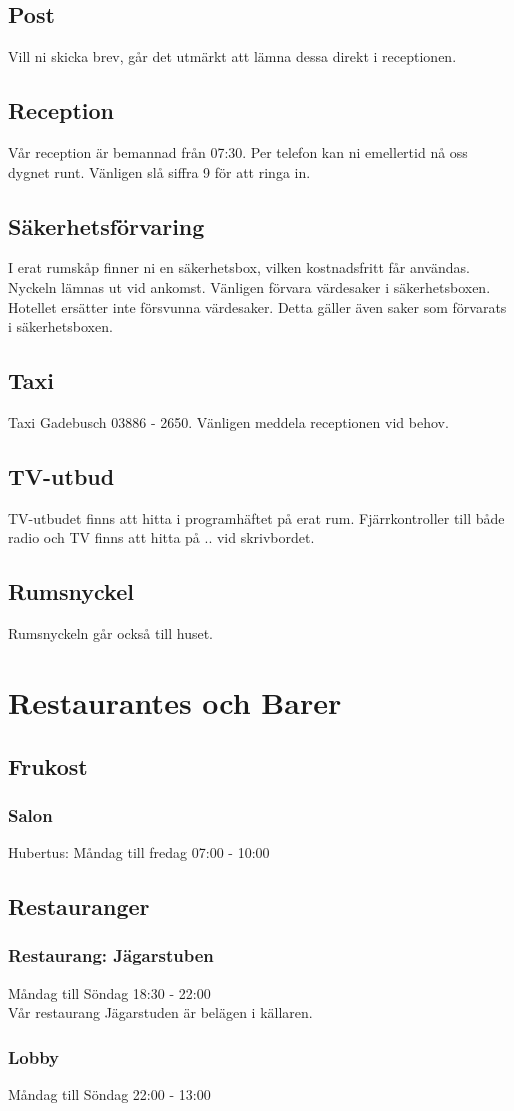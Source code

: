 \documentclass{article}
\begin{document}
\subsection{Post}
Vill ni skicka brev, går det utmärkt att lämna dessa direkt i receptionen.

\subsection{Reception}
Vår reception är bemannad från 07:30. Per telefon kan ni emellertid nå oss dygnet runt. Vänligen slå siffra 9 för
att ringa in.
\subsection{Säkerhetsförvaring}
I erat rumskåp finner ni en säkerhetsbox, vilken kostnadsfritt får användas.
Nyckeln lämnas ut vid ankomst.  Vänligen förvara värdesaker i säkerhetsboxen.
Hotellet ersätter inte försvunna värdesaker. Detta gäller även saker som
förvarats i säkerhetsboxen.

\subsection{Taxi}
Taxi Gadebusch 03886 - 2650. Vänligen meddela receptionen vid behov.

\subsection{TV-utbud}
TV-utbudet finns att hitta i programhäftet på erat rum. Fjärrkontroller till
både radio och TV finns att hitta på .. vid skrivbordet.

\subsection{Rumsnyckel}
Rumsnyckeln går också till huset.

\section{Restaurantes och Barer}

\subsection{Frukost}

\subsubsection{Salon}
Hubertus: Måndag till fredag 07:00 - 10:00

\subsection{Restauranger}
\subsubsection{Restaurang: Jägarstuben}
Måndag till Söndag 18:30 - 22:00 \\
Vår restaurang Jägarstuden är belägen i källaren.

\subsubsection{Lobby}
Måndag till Söndag 22:00 - 13:00 \\
\end{document}
